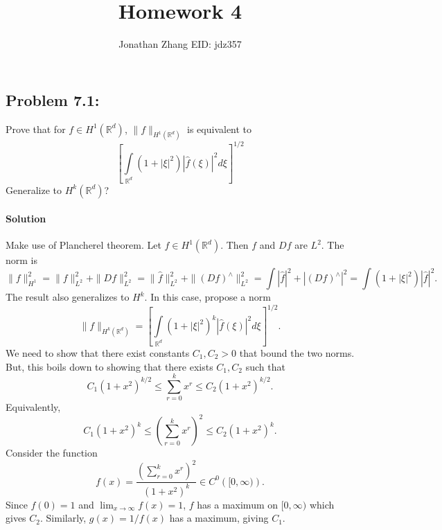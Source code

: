 \documentclass[letterpaper,twoside,11pt]{article}
\theoremstyle{mystyle}
\newcommand{\R}{{\mathbb R}}
\begin{document}
\title{\vspace{-2\baselineskip} 
Homework 4
}
\author{Jonathan Zhang \qquad EID: { jdz357} }
\date{}
\maketitle


\subsection*{Problem 7.1:}
Prove that for $f \in H^1\left( \R^d \right)$, $\|f\|_{H^1\left( \R^d \right)}$ is equivalent to 
\[\left[\int\limits_{\R^d} \left( 1+|\xi|^2 \right)|\hat f\left( \xi \right)|^2d\xi \right]^{1/2}\]
Generalize to $H^k\left( \R^d \right)$?

\paragraph*{Solution}
Make use of Plancherel theorem. Let $f\in H^1\left( \R^d \right)$. Then $f$ and $Df$ are $L^2$. The norm is 
\[\|f\|_{H^1}^2 = \|f\|^2_{L^2} + \|Df\|^2_{L^2} = \|\hat f\|^2_{L^2} + \|\left( Df \right)^\land\|^2_{L^2} = \int |\hat f|^2 + |\left( Df \right)^\land|^2 = \int \left( 1+|\xi|^2 \right) |\hat f|^2.\]
The result also generalizes to $H^k$. In this case, propose a norm 
\[\|f\|_{H^k\left( \R^d \right)} = \left[\int\limits_{\R^d} \left( 1+|\xi|^2 \right)^k|\hat f\left( \xi \right)|^2d\xi \right]^{1/2}.\]
We need to show that there exist constants $C_1, C_2 >0$ that bound the two norms. But, this boils down to showing that there exists $C_1, C_2$ such that 
\[C_1 \left( 1+x^2 \right)^{k/2} \leq \sum_{r=0}^{k} x^r \leq C_2 \left( 1+x^2 \right)^{k/2}. \]
Equivalently, 
\[C_1 \left( 1+x^2 \right)^{k} \leq \left( {\sum_{r=0}^{k} x^r} \right)^2 \leq C_2 \left( 1+x^2 \right)^{k}. \]
Consider the function 
\[f (x) = \frac{\left( {\sum_{r=0}^{k} x^r} \right)^2}{\left( 1+x^2 \right)^{k}}\in C^0\left( [0,\infty ) \right).\]
Since $f(0) = 1$ and $\lim_{x\to \infty} f(x) = 1$, $f$ has a maximum on $[0,\infty)$ which gives $C_2$. Similarly, $g(x) = 1/f(x)$ has a maximum, giving $C_1$. 
\end{document}

